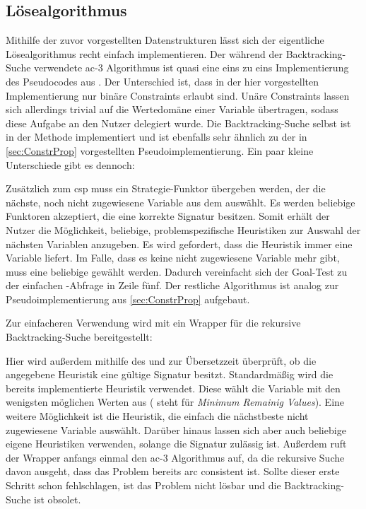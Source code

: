 \subsection{Lösealgorithmus}
Mithilfe der zuvor vorgestellten Datenstrukturen lässt sich der eigentliche Lösealgorithmus recht einfach implementieren. Der während der Backtracking-Suche verwendete \ac*{ac}-3
Algorithmus ist quasi eine eins zu eins Implementierung des Pseudocodes aus \cite{ac3}. Der Unterschied ist, dass in der hier vorgestellten Implementierung nur binäre Constraints
erlaubt sind. Unäre Constraints lassen sich allerdings trivial auf die Wertedomäne einer Variable übertragen, sodass diese Aufgabe an den Nutzer delegiert wurde.
Die Backtracking-Suche selbst ist in der Methode  implementiert und ist ebenfalls sehr ähnlich zu der in \cref{sec:ConstrProp} vorgestellten
Pseudoimplementierung. Ein paar kleine Unterschiede gibt es dennoch:

Zusätzlich zum \ac*{csp} muss ein Strategie-Funktor übergeben werden, der die nächste, noch nicht zugewiesene Variable aus dem  auswählt. Es werden beliebige
Funktoren akzeptiert, die eine korrekte Signatur besitzen. Somit erhält der Nutzer die Möglichkeit, beliebige, problemspezifische Heuristiken zur Auswahl der nächsten Variablen
anzugeben. Es wird gefordert, dass die Heuristik immer eine Variable liefert. Im Falle, dass es keine nicht zugewiesene Variable mehr gibt, muss eine beliebige gewählt werden.
Dadurch vereinfacht sich der Goal-Test zu der einfachen -Abfrage in Zeile fünf. Der restliche Algorithmus ist analog zur Pseudoimplementierung aus \cref{sec:ConstrProp}
aufgebaut.

Zur einfacheren Verwendung wird mit  ein Wrapper für die rekursive Backtracking-Suche bereitgestellt:

Hier wird außerdem mithilfe des  und  zur Übersetzzeit überprüft, ob die angegebene Heuristik eine gültige Signatur besitzt.
Standardmäßig wird die bereits implementierte Heuristik  verwendet. Diese wählt die Variable mit den wenigsten möglichen Werten aus ( steht
für \textit{Minimum Remainig Values}). Eine weitere Möglichkeit ist die  Heuristik, die einfach die nächstbeste nicht zugewiesene Variable auswählt.
Darüber hinaus lassen sich aber auch beliebige eigene Heuristiken verwenden, solange die Signatur zulässig ist. Außerdem ruft der Wrapper anfangs einmal den \ac*{ac}-3 Algorithmus
auf, da die rekursive Suche davon ausgeht, dass das Problem bereits arc consistent ist. Sollte dieser erste Schritt schon fehlschlagen, ist das Problem nicht lösbar und die
Backtracking-Suche ist obsolet.